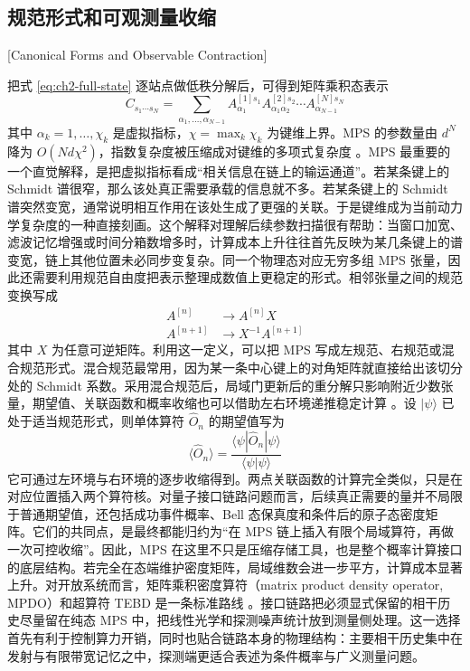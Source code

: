 \subsection{规范形式和可观测量收缩}[Canonical Forms and Observable Contraction]

把式 \eqref{eq:ch2-full-state} 逐站点做低秩分解后，可得到矩阵乘积态表示
\begin{equation}
C_{s_1\cdots s_N}
=
\sum_{\alpha_1,\ldots,\alpha_{N-1}}
A^{[1]s_1}_{\alpha_1}
A^{[2]s_2}_{\alpha_1\alpha_2}
\cdots
A^{[N]s_N}_{\alpha_{N-1}}
\label{eq:ch2-mps}
\end{equation}
其中 $\alpha_k=1,\ldots,\chi_k$ 是虚拟指标，$\chi=\max_k\chi_k$ 为键维上界。MPS 的参数量由 $d^N$ 降为 $O(Nd\chi^2)$，指数复杂度被压缩成对键维的多项式复杂度 \cite{Schollwoeck2011MPS,Orus2014TensorNetworks}。MPS 最重要的一个直觉解释，是把虚拟指标看成“相关信息在链上的输运通道”。若某条键上的 Schmidt 谱很窄，那么该处真正需要承载的信息就不多。若某条键上的 Schmidt 谱突然变宽，通常说明相互作用在该处生成了更强的关联。于是键维成为当前动力学复杂度的一种直接刻画。这个解释对理解后续参数扫描很有帮助：当窗口加宽、滤波记忆增强或时间分箱数增多时，计算成本上升往往首先反映为某几条键上的谱变宽，链上其他位置未必同步变复杂。同一个物理态对应无穷多组 MPS 张量，因此还需要利用规范自由度把表示整理成数值上更稳定的形式。相邻张量之间的规范变换写成
\begin{align}
A^{[n]} &\rightarrow A^{[n]}X\\
A^{[n+1]} &\rightarrow X^{-1}A^{[n+1]}
\label{eq:ch2-gauge-transform}
\end{align}
其中 $X$ 为任意可逆矩阵。利用这一定义，可以把 MPS 写成左规范、右规范或混合规范形式。混合规范最常用，因为某一条中心键上的对角矩阵就直接给出该切分处的 Schmidt 系数。采用混合规范后，局域门更新后的重分解只影响附近少数张量，期望值、关联函数和概率收缩也可以借助左右环境递推稳定计算 \cite{Schollwoeck2011MPS,Orus2014TensorNetworks}。设 $|\psi\rangle$ 已处于适当规范形式，则单体算符 $\hat O_n$ 的期望值写为
\begin{equation}
\langle \hat O_n \rangle
=
\frac{\langle \psi|\hat O_n|\psi\rangle}{\langle \psi|\psi\rangle}
\label{eq:ch2-onebody-expectation}
\end{equation}
它可通过左环境与右环境的逐步收缩得到。两点关联函数的计算完全类似，只是在对应位置插入两个算符核。对量子接口链路问题而言，后续真正需要的量并不局限于普通期望值，还包括成功事件概率、Bell 态保真度和条件后的原子态密度矩阵。它们的共同点，是最终都能归约为“在 MPS 链上插入有限个局域算符，再做一次可控收缩”。因此，MPS 在这里不只是压缩存储工具，也是整个概率计算接口的底层结构。若完全在态端维护密度矩阵，局域维数会进一步平方，计算成本显著上升。对开放系统而言，矩阵乘积密度算符（matrix product density operator, MPDO）和超算符 TEBD 是一条标准路线 \cite{Verstraete2004MPDO,Zwolak2004MixedStateDynamics}。接口链路把必须显式保留的相干历史尽量留在纯态 MPS 中，把线性光学和探测噪声统计放到测量侧处理。这一选择首先有利于控制算力开销，同时也贴合链路本身的物理结构：主要相干历史集中在发射与有限带宽记忆之中，探测端更适合表述为条件概率与广义测量问题。

